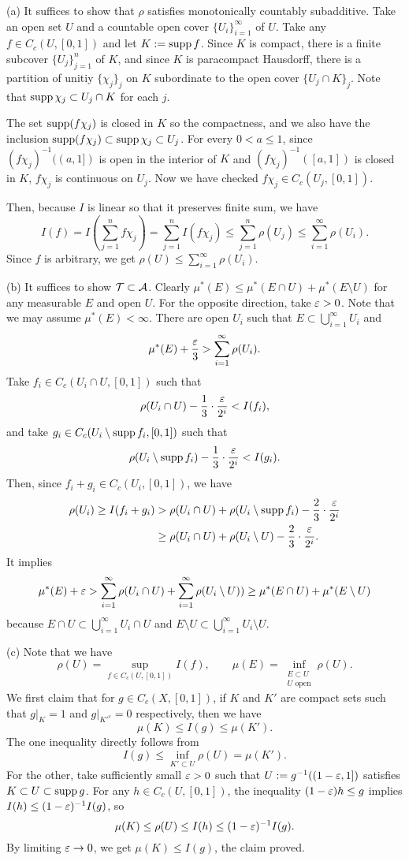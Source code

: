 \documentclass{../../large}
\begin{document}
\begin{pf}
(a)
It suffices to show that $\rho$ satisfies monotonically countably subadditive.
Take an open set $U$ and a countable open cover $\{U_i\}_{i=1}^\infty$ of $U$.
Take any $f\in C_c(U,[0,1])$ and let $K:=\operatorname{supp} f$.
Since $K$ is compact, there is a finite subcover $\{U_j\}_{j=1}^n$ of $K$, and since $K$ is paracompact Hausdorff, there is a partition of unitiy $\{\chi_j\}_j$ on $K$ subordinate to the open cover $\{U_j\cap K\}_j$.
Note that $\operatorname{supp}\chi_j\subset U_j\cap K$ for each $j$.

The set $\operatorname{supp}(f\chi_j)$ is closed in $K$ so the compactness, and we also have the inclusion $\operatorname{supp}(f\chi_j)\subset\operatorname{supp}\chi_j\subset U_j$.
For every $0<a\le 1$, since $(f\chi_j)^{-1}((a,1])$ is open in the interior of $K$ and $(f\chi_j)^{-1}([a,1])$ is closed in $K$, $f\chi_j$ is continuous on $U_j$.
Now we have checked $f\chi_j\in C_c(U_j,[0,1])$.

Then, because $I$ is linear so that it preserves finite sum, we have
\[I(f)=I\left(\sum_{j=1}^n f\chi_j\right)=\sum_{j=1}^n I(f\chi_j)\le\sum_{j=1}^n\rho(U_j)\le\sum_{i=1}^\infty\rho(U_i).\]
Since $f$ is arbitrary, we get $\rho(U)\le\sum_{i=1}^\infty\rho(U_i)$.

(b)
It suffices to show $\mathcal{T}\subset\mathcal{A}$.
Clearly $\mu^*(E)\le\mu^*(E\cap U)+\mu^*(E\setminus U)$ for any measurable $E$ and open $U$.
For the opposite direction, take $\varepsilon>0$.
Note that we may assume $\mu^*(E)<\infty$.
There are open $U_i$ such that $E\subset\bigcup_{i=1}^\infty U_i$ and
\[\mu^*(E)+\frac{\varepsilon}3>\sum_{i=1}^\infty\rho(U_i).\]
Take $f_i\in C_c(U_i\cap U,[0,1])$ such that
\[\rho(U_i\cap U)-\frac13\cdot\frac{\varepsilon}{2^i}<I(f_i),\]
and take $g_i\in C_c(U_i\setminus\operatorname{supp} f_i,[0,1])$ such that
\[\rho(U_i\setminus\operatorname{supp} f_i)-\frac13\cdot\frac{\varepsilon}{2^i}<I(g_i).\]
Then, since $f_i+g_i\in C_c(U_i,[0,1])$, we have
\begin{align*}
\rho(U_i)\ge I(f_i+g_i)
&>\rho(U_i\cap U)+\rho(U_i\setminus\operatorname{supp} f_i)-\frac23\cdot\frac{\varepsilon}{2^i}\\
&\ge\rho(U_i\cap U)+\rho(U_i\setminus U)-\frac23\cdot\frac{\varepsilon}{2^i}.
\end{align*}
It implies
\[\mu^*(E)+\varepsilon>\sum_{i=1}^\infty\rho(U_i\cap U)+\sum_{i=1}^\infty\rho(U_i\setminus U))\ge\mu^*(E\cap U)+\mu^*(E\setminus U)\]
because $E\cap U\subset\bigcup_{i=1}^\infty U_i\cap U$ and $E\setminus U\subset\bigcup_{i=1}^\infty U_i\setminus U$.


(c)
Note that we have
\[\rho(U)=\sup_{f\in C_c(U,[0,1])}I(f),\qquad\mu(E)=\inf_{\substack{E\subset U\\U\text{ open}}}\rho(U).\]
We first claim that for $g\in C_c(X,[0,1])$, if $K$ and $K'$ are compact sets such that $g|_K=1$ and $g|_{K'^c}=0$ respectively, then we have
\[\mu(K)\le I(g)\le\mu(K').\]
The one inequality directly follows from
\[I(g)\le\inf_{K'\subset U}\rho(U)=\mu(K').\]
For the other, take sufficiently small $\varepsilon>0$ such that $U:=g^{-1}((1-\varepsilon,1])$ satisfies $K\subset U\subset\operatorname{supp} g$.
For any $h\in C_c(U,[0,1])$, the inequality $(1-\varepsilon)h\le g$ implies $I(h)\le(1-\varepsilon)^{-1}I(g)$, so
\[\mu(K)\le\rho(U)\le I(h)\le(1-\varepsilon)^{-1}I(g).\]
By limiting $\varepsilon\to0$, we get $\mu(K)\le I(g)$, the claim proved.



\end{pf}
\end{document}
